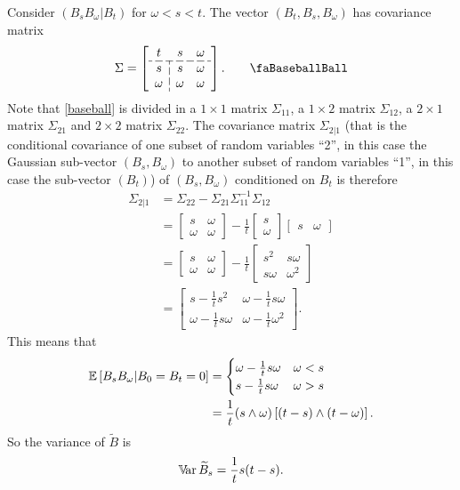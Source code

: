 \documentclass[12pt]{report}
\begin{document}
\begin{fancyproof}
	Consider $(B_{s}B_{\omega}|B_{t})$ for $\omega<s<t$. The vector $(B_{t},B_{s},B_{\omega})$ has covariance matrix
	\begin{equation*}
		\Sigma=\left[\begin{array}{c;{6pt/2pt}cc}
			t&s&\omega\\ \hdashline[6pt/2pt]
			s&s&\omega\\
			\omega&\omega&\omega
		\end{array}\right].\tag*{\faBaseballBall}\label{baseball}
	\end{equation*}
	Note that \ref{baseball} is divided in a $1\times 1$ matrix $\Sigma_{11}$, a $1\times 2$ matrix $\Sigma_{12}$, a $2\times 1$ matrix $\Sigma_{21}$ and $2\times2$ matrix $\Sigma_{22}$. The covariance matrix $\Sigma_{2|1}$ (that is the conditional covariance of one subset of random variables ``2'', in this case the Gaussian sub-vector $(B_{s},B_{\omega})$ to another subset of random variables ``1'', in this case the sub-vector $(B_{t})$) of $(B_{s},B_{\omega})$ conditioned on $B_{t}$ is therefore 
	\begin{align*}
		\Sigma_{2|1}&=\Sigma_{22}-\Sigma_{21}\Sigma_{11}^{-1}\Sigma_{12}\\
		&=\begin{bmatrix}
			s&\omega\\
			\omega&\omega
		\end{bmatrix}-\frac{1}{t}\begin{bmatrix}
		s\\ \omega
		\end{bmatrix}\begin{bmatrix}
		s&\omega
		\end{bmatrix}\\
		&=\begin{bmatrix}
			s&\omega\\
			\omega&\omega
		\end{bmatrix}-\frac{1}{t}\begin{bmatrix}
		s^{2}&s\omega\\
		s\omega&\omega^{2}
		\end{bmatrix}\\
		&=\begin{bmatrix}
			s-\frac{1}{t}s^{2}&\omega-\frac{1}{t}s\omega\\
			\omega-\frac{1}{t}s\omega&\omega-\frac{1}{t}\omega^{2}
		\end{bmatrix}.
	\end{align*}
	This means that 
	\begin{align*}
		\mathbb{E}\left[B_{s}B_{\omega}|B_{0}=B_{t}=0\right]&=\begin{cases}
			\omega-\frac{1}{t}s\omega&\omega<s\\
			s-\frac{1}{t}s\omega&\omega>s
		\end{cases}\\
		&=\frac{1}{t}(s\wedge\omega)\left[(t-s)\wedge(t-\omega)\right].
	\end{align*}
	So the variance of $\widetilde{B}$ is
	\begin{equation*}
		\mathbb{V}\!\mathrm{ar}\,\widetilde{B}_{s}=\frac{1}{t}s(t-s).
	\end{equation*}
\end{fancyproof} 
\end{document}
